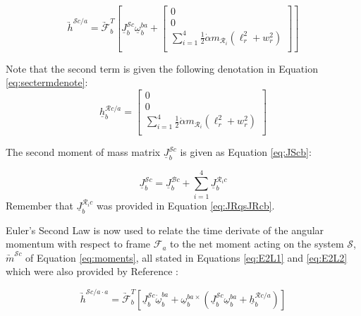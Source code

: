 \documentclass[journal]{IEEEtran}
\begin{document}
\begin{equation}
\underrightarrow{h}^{\mathcal{S}c/a}=\underrightarrow{\mathcal{F}}^T_b[\underline{J}^{\mathcal{S}c}_b\underline{\omega}^{ba}_b+\left[ \begin{array}{c}
				0 \\
				0 \\
				\sum_{i=1}^4\frac{1}{2}\dot{\alpha}m_{\mathcal{R}_i}(\ell_r^2+w_r^2) \\
				\end{array} \right]]
\label{eq:angmomentum}
\end{equation}

Note that the second term is given the following denotation in Equation \ref{eq:sectermdenote}:
\begin{equation}
\underline{h}^{\mathcal{R}c/a}_{b}=\left[ \begin{array}{c}
				0 \\
				0 \\
				\sum_{i=1}^4\frac{1}{2}\dot{\alpha}m_{\mathcal{R}_i}(\ell_r^2+w_r^2) \\
				\end{array} \right]
\label{eq:sectermdenote}
\end{equation}

The second moment of mass matrix $\underline{J}^{\mathcal{S}c}_b$ is given as Equation \ref{eq:JScb}:

\begin{equation}
\underline{J}^{\mathcal{S}c}_b=\underline{J}^{\mathcal{B}c}_b+\sum_{i=1}^4\underline{J}^{\mathcal{R}_ic}_b
\label{eq:JScb}
\end{equation}
Remember that $\underline{J}^{\mathcal{R}_ic}_b$ was provided in Equation \ref{eq:JRqsJRcb}.

Euler's Second Law is now used to relate the time derivate of the angular momentum with respect to frame $\mathcal{F}_a$ to the net moment acting on the system $\mathcal{S}$, $\underrightarrow{m}^{\mathcal{S}c}$ of Equation \ref{eq:moments}, all stated in Equations \ref{eq:E2L1} and \ref{eq:E2L2} which were also provided by Reference \cite{dual_spin}:

\begin{equation}
\underrightarrow{h}^{\mathcal{S}c/a \cdot a}=\underrightarrow{\mathcal{F}}^T_b[\underline{J}^{\mathcal{S}c}_b\underline{\dot{\omega}}^{ba}_b+\underline{\omega}^{ba \times}_b(\underline{J}^{\mathcal{S}c}_b\underline{\omega}^{ba}_b+\underline{h}^{\mathcal{R}c/a}_{b})]
\label{eq:E2L1}
\end{equation}
\end{document}
